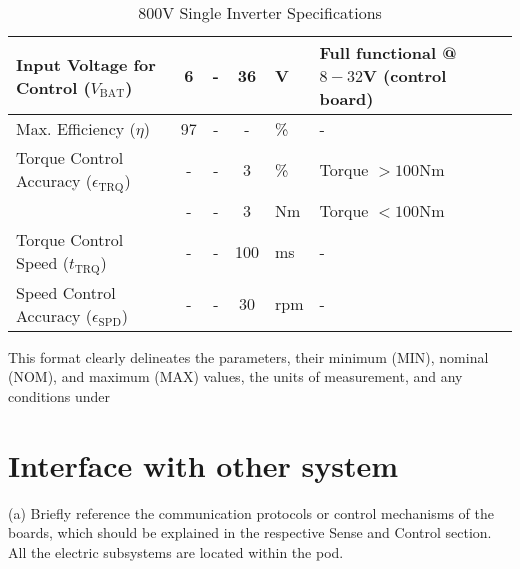 \begin{table}[H]
\begin{tabular}{|l|c|c|c|l|l|}
        \hline
        Input Voltage for Control ($V_{\text{BAT}}$) & 6 & - & 36 & V & Full functional @ $8-32$V (control board) \\
        \hline
        Max. Efficiency ($\eta$) & 97 & - & - & \% & - \\
        \hline
        Torque Control Accuracy ($\epsilon_{\text{TRQ}}$) & - & - & 3 & \% & Torque $>100$Nm \\
        \hline
         & - & - & 3 & Nm & Torque $<100$Nm \\
        \hline
        Torque Control Speed ($t_{\text{TRQ}}$) & - & - & 100 & ms & - \\
        \hline
        Speed Control Accuracy ($\epsilon_{\text{SPD}}$) & - & - & 30 & rpm & - \\
        \hline
    \end{tabular}
    \caption{800V Single Inverter Specifications}
    \label{inverter_specs}
\end{table}

This format clearly delineates the parameters, their minimum (MIN), nominal (NOM), and maximum (MAX) values, the units of measurement, and any conditions under

\section{Interface with other system}
(a) Briefly reference the communication protocols or control mechanisms of the boards, which should be explained in the respective Sense and Control section. \\
All the electric subsystems are located within the pod. \\

